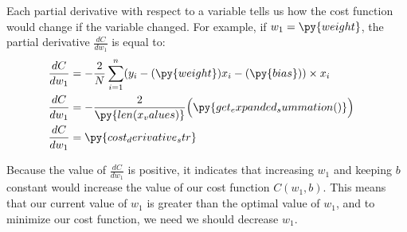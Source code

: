 \documentclass[12pt]{article}
\begin{document}


Each partial derivative with respect to a variable tells us how the cost function would change if the variable changed. For example, if $w_1 = \py{weight}$, the partial derivative $\frac{dC}{dw_1}$ is equal to:
\begin{align*}
	\frac{dC}{dw_1} & = -\frac{2}{N} \sum_{i=1}^{n} (y_i - (\py{weight})x_i - (\py{bias})) \times x_i
	\\
	\frac{dC}{dw_1} & =
	\begin{aligned}[t]
		-\frac{2}{\py{len(x_values)}}
		\Big( & \py{get_expanded_summation()}\Big)
	\end{aligned}
	\\
	\frac{dC}{dw_1} & = \py{cost_derivative_str}
\end{align*}

Because the value of $\frac{dC}{dw_1}$ is positive, it indicates that increasing $w_1$ and keeping $b$ constant would increase the value of our cost function $C(w_1, b)$. This means that our current value of $w_1$ is greater than the optimal value of $w_1$, and to minimize our cost function, we need we should decrease $w_1$.
\end{document}
